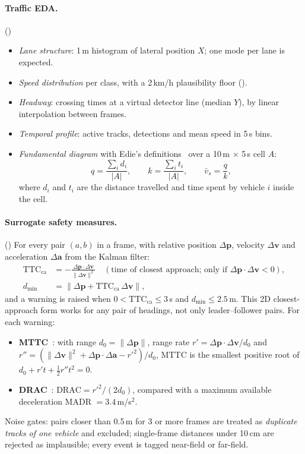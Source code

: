 \documentclass[11pt,a4paper]{article}
\DeclareRobustCommand{\file}[1]{\texttt{\detokenize{#1}}}
\begin{document}
\paragraph{Traffic EDA.} (\file{eda.py})
\begin{itemize}[nosep]
  \item \emph{Lane structure}: 1\,m histogram of lateral position $X$; one mode per lane is expected.
  \item \emph{Speed distribution} per class, with a 2\,km/h plausibility floor (\file{plausibility.py}).
  \item \emph{Headway}: crossing times at a virtual detector line (median $Y$), by linear interpolation between frames.
  \item \emph{Temporal profile}: active tracks, detections and mean speed in 5\,s bins.
  \item \emph{Fundamental diagram} with Edie's definitions~\cite{edie1963} over a 10\,m $\times$ 5\,s cell $A$:
  \begin{equation}
     q = \frac{\sum_i d_i}{|A|},\qquad k = \frac{\sum_i t_i}{|A|},\qquad \bar v_s = \frac{q}{k},
  \end{equation}
  where $d_i$ and $t_i$ are the distance travelled and time spent by vehicle $i$ inside the cell.
\end{itemize}

\paragraph{Surrogate safety measures.} (\file{ttc.py})
For every pair $(a,b)$ in a frame, with relative position $\Delta\mathbf{p}$, velocity $\Delta\mathbf{v}$ and acceleration
$\Delta\mathbf{a}$ from the Kalman filter:
\begin{align}
  \text{TTC}_{\text{ca}} &= -\frac{\Delta\mathbf{p}\cdot\Delta\mathbf{v}}{\lVert\Delta\mathbf{v}\rVert^2}
      \quad(\text{time of closest approach; only if } \Delta\mathbf{p}\cdot\Delta\mathbf{v}<0),\\
  d_{\min} &= \lVert \Delta\mathbf{p} + \text{TTC}_{\text{ca}}\,\Delta\mathbf{v}\rVert,
\end{align}
and a warning is raised when $0 < \text{TTC}_{\text{ca}} \le 3$\,s and $d_{\min} \le 2.5$\,m. This 2D closest-approach
form works for any pair of headings, not only leader--follower pairs. For each warning:
\begin{itemize}[nosep]
  \item \textbf{MTTC}~\cite{ozbay2008}: with range $d_0=\lVert\Delta\mathbf{p}\rVert$, range rate $r'=\Delta\mathbf{p}\cdot\Delta\mathbf{v}/d_0$ and
        $r''=(\lVert\Delta\mathbf{v}\rVert^2+\Delta\mathbf{p}\cdot\Delta\mathbf{a}-r'^2)/d_0$, MTTC is the smallest positive root of
        $d_0 + r' t + \tfrac12 r'' t^2 = 0$.
  \item \textbf{DRAC}~\cite{cooper1976}: $\text{DRAC} = r'^2 / (2 d_0)$, compared with a maximum available deceleration
        MADR $=3.4$\,m/s$^2$.
\end{itemize}
Noise gates: pairs closer than 0.5\,m for 3 or more frames are treated as \emph{duplicate tracks of one vehicle} and excluded;
single-frame distances under 10\,cm are rejected as implausible; every event is tagged near-field or far-field.
\end{document}
